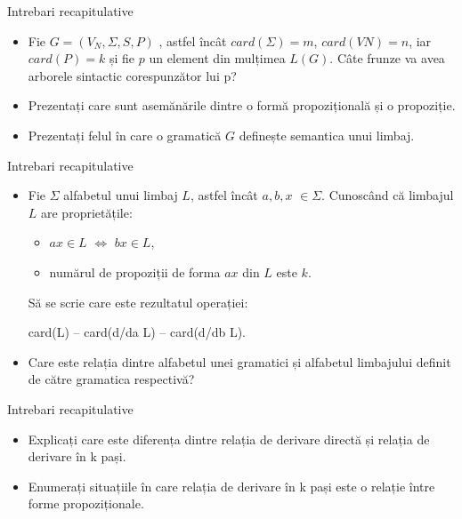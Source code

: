 \documentclass[pdf]{beamer}
\begin{document}
\begin{frame}{Intrebari recapitulative}
\begin{itemize}
\item
Fie $G = (V_{N}, \Sigma, S, P )$ , astfel încât $card(\Sigma)=m$,  $card(VN)=n$, iar $card(P)=k$ și fie $p$ un element din mulțimea $L(G)$. Câte frunze va avea arborele sintactic corespunzător lui p?
\newline 

\item
Prezentați care sunt asemănările dintre o formă propozițională și o propoziție.
\newline

\item
Prezentați felul în care o gramatică $G$ definește semantica unui limbaj.
\newline

\end{itemize}
\end{frame}



\begin{frame}{Intrebari recapitulative}
\begin{itemize}
\item
Fie $\Sigma$ alfabetul unui limbaj $L$, astfel încât $a, b, x$ $\in \Sigma$. Cunoscând că limbajul $L$ are proprietățile:

\begin{itemize}
\item
$ax \in L$ $\Leftrightarrow$ $bx \in L$,

\item
numărul de propoziții de forma $ax$ din $L$ este $k$.
\end{itemize}

Să se scrie care este rezultatul operației: 

card(L) – card(d/da L) – card(d/db L).
\newline

\item
Care este relația dintre alfabetul unei gramatici și alfabetul limbajului definit de către gramatica respectivă?

\end{itemize}
\end{frame}



\begin{frame}{Intrebari recapitulative}
\begin{itemize}

\item
Explicați care este diferența dintre relația de derivare directă și relația de derivare în k pași.
\newline

\item
Enumerați situațiile în care relația de derivare în k pași este o relație între forme propoziționale.

\end{itemize}
\end{frame}
\end{document}
